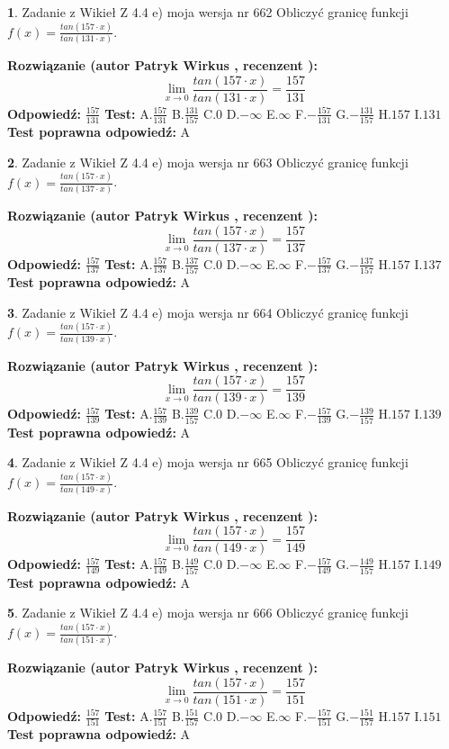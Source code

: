 \documentclass[12pt, a4paper]{article}
\theoremstyle{definition} %
\newtheorem{zad}{}
\newcommand{\zadStart}[1]{\begin{zad}#1\newline}
\newcommand{\zadStop}{\end{zad}}
\newcommand{\rozwStart}[2]{\noindent \textbf{Rozwiązanie (autor #1 , recenzent #2): }\newline}
\newcommand{\rozwStop}{\newline}
\newcommand{\odpStart}{\noindent \textbf{Odpowiedź:}\newline}
\newcommand{\odpStop}{\newline}
\newcommand{\testStart}{\noindent \textbf{Test:}\newline}
\newcommand{\testStop}{\newline}
\newcommand{\kluczStart}{\noindent \textbf{Test poprawna odpowiedź:}\newline}
\newcommand{\kluczStop}{\newline}
\begin{document}
\zadStart{Zadanie z Wikieł Z 4.4 e) moja wersja nr 662}
Obliczyć granicę funkcji $f(x)=\frac{tan(157\cdot x)}{tan(131\cdot x)}$.
\zadStop
\rozwStart{Patryk Wirkus}{}
$$\lim\limits_{x\to 0}\frac{tan(157\cdot x)}{tan(131\cdot x)}=
\frac{157}{131}$$
\rozwStop
\odpStart
$\frac{157}{131}$
\odpStop
\testStart
A.$\frac{157}{131}$
B.$\frac{131}{157}$
C.$0$
D.$-\infty$
E.$\infty$
F.$-\frac{157}{131}$
G.$-\frac{131}{157}$
H.$157$
I.$131$
\testStop
\kluczStart
A
\kluczStop



\zadStart{Zadanie z Wikieł Z 4.4 e) moja wersja nr 663}
Obliczyć granicę funkcji $f(x)=\frac{tan(157\cdot x)}{tan(137\cdot x)}$.
\zadStop
\rozwStart{Patryk Wirkus}{}
$$\lim\limits_{x\to 0}\frac{tan(157\cdot x)}{tan(137\cdot x)}=
\frac{157}{137}$$
\rozwStop
\odpStart
$\frac{157}{137}$
\odpStop
\testStart
A.$\frac{157}{137}$
B.$\frac{137}{157}$
C.$0$
D.$-\infty$
E.$\infty$
F.$-\frac{157}{137}$
G.$-\frac{137}{157}$
H.$157$
I.$137$
\testStop
\kluczStart
A
\kluczStop



\zadStart{Zadanie z Wikieł Z 4.4 e) moja wersja nr 664}
Obliczyć granicę funkcji $f(x)=\frac{tan(157\cdot x)}{tan(139\cdot x)}$.
\zadStop
\rozwStart{Patryk Wirkus}{}
$$\lim\limits_{x\to 0}\frac{tan(157\cdot x)}{tan(139\cdot x)}=
\frac{157}{139}$$
\rozwStop
\odpStart
$\frac{157}{139}$
\odpStop
\testStart
A.$\frac{157}{139}$
B.$\frac{139}{157}$
C.$0$
D.$-\infty$
E.$\infty$
F.$-\frac{157}{139}$
G.$-\frac{139}{157}$
H.$157$
I.$139$
\testStop
\kluczStart
A
\kluczStop



\zadStart{Zadanie z Wikieł Z 4.4 e) moja wersja nr 665}
Obliczyć granicę funkcji $f(x)=\frac{tan(157\cdot x)}{tan(149\cdot x)}$.
\zadStop
\rozwStart{Patryk Wirkus}{}
$$\lim\limits_{x\to 0}\frac{tan(157\cdot x)}{tan(149\cdot x)}=
\frac{157}{149}$$
\rozwStop
\odpStart
$\frac{157}{149}$
\odpStop
\testStart
A.$\frac{157}{149}$
B.$\frac{149}{157}$
C.$0$
D.$-\infty$
E.$\infty$
F.$-\frac{157}{149}$
G.$-\frac{149}{157}$
H.$157$
I.$149$
\testStop
\kluczStart
A
\kluczStop



\zadStart{Zadanie z Wikieł Z 4.4 e) moja wersja nr 666}
Obliczyć granicę funkcji $f(x)=\frac{tan(157\cdot x)}{tan(151\cdot x)}$.
\zadStop
\rozwStart{Patryk Wirkus}{}
$$\lim\limits_{x\to 0}\frac{tan(157\cdot x)}{tan(151\cdot x)}=
\frac{157}{151}$$
\rozwStop
\odpStart
$\frac{157}{151}$
\odpStop
\testStart
A.$\frac{157}{151}$
B.$\frac{151}{157}$
C.$0$
D.$-\infty$
E.$\infty$
F.$-\frac{157}{151}$
G.$-\frac{151}{157}$
H.$157$
I.$151$
\testStop
\kluczStart
A
\kluczStop
\end{document}
